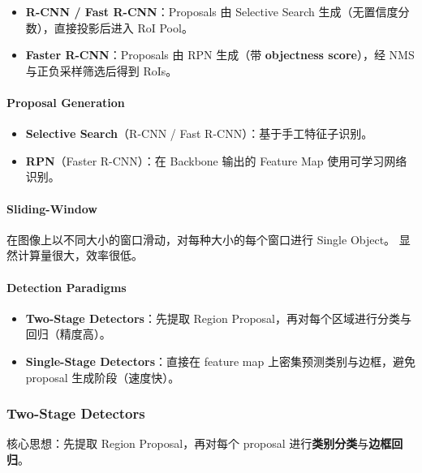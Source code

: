 \begin{itemize}
\tightlist
\item
  \textbf{R-CNN / Fast R-CNN}：Proposals 由 Selective Search
  生成（无置信度分数），直接投影后进入 RoI Pool。
\item
  \textbf{Faster R-CNN}：Proposals 由 RPN 生成（带 \textbf{objectness
  score}），经 NMS 与正负采样筛选后得到 RoIs。
\end{itemize}

\paragraph{Proposal Generation}\label{proposal-generation}

\begin{itemize}
\tightlist
\item
  \textbf{Selective Search}（R-CNN / Fast R-CNN）：基于手工特征子识别。
\item
  \textbf{RPN}（Faster R-CNN）：在 Backbone 输出的 Feature Map
  使用可学习网络识别。
\end{itemize}

\paragraph{Sliding-Window}\label{sliding-window}

在图像上以不同大小的窗口滑动，对每种大小的每个窗口进行 Single Object。
显然计算量很大，效率很低。

\paragraph{Detection Paradigms}\label{detection-paradigms}

\begin{itemize}
\tightlist
\item
  \textbf{Two-Stage Detectors}：先提取 Region
  Proposal，再对每个区域进行分类与回归（精度高）。
\item
  \textbf{Single-Stage Detectors}：直接在 feature map
  上密集预测类别与边框，避免 proposal 生成阶段（速度快）。
\end{itemize}

\subsubsection{Two-Stage Detectors}\label{two-stage-detectors}

核心思想：先提取 Region Proposal，再对每个 proposal
进行\textbf{类别分类}与\textbf{边框回归}。

